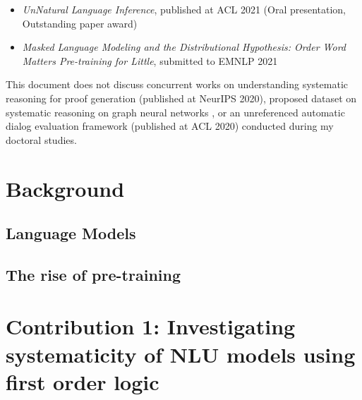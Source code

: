 \documentclass[12pt]{article}
\begin{document}
\begin{itemize}
  \item \textit{UnNatural Language Inference}, published at ACL 2021 (Oral presentation, Outstanding paper award) \cite{sinha2021}
  \item \textit{Masked Language Modeling and the Distributional Hypothesis: Order Word Matters Pre-training for Little}, submitted to EMNLP 2021 \cite{sinha2021a}
\end{itemize}

This document does not discuss concurrent works on understanding systematic reasoning for proof generation \cite{gontier2020} (published at NeurIPS 2020), proposed dataset on systematic reasoning on graph neural networks \cite{sinha2020c}, or an unreferenced automatic dialog evaluation framework \cite{sinha2020d} (published at ACL 2020) conducted during my doctoral studies.






\section{Background}


\subsection{Language Models}



\subsection{The rise of pre-training}

\section{Contribution 1: Investigating systematicity of NLU models using first order logic}
\label{sec:cont1}
\end{document}
